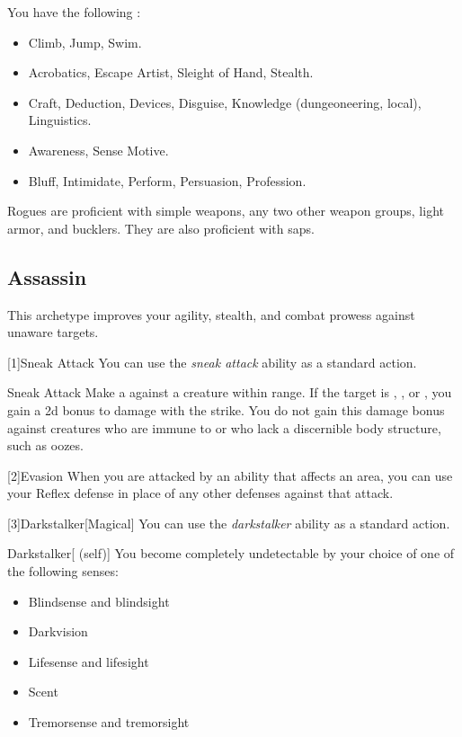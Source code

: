        You have the following :
        \begin{itemize}
            \item {} Climb, Jump, Swim.
            \item {} Acrobatics, Escape Artist, Sleight of Hand, Stealth.
            \item {} Craft, Deduction, Devices, Disguise, Knowledge (dungeoneering, local), Linguistics.
            \item {} Awareness, Sense Motive.
            \item {} Bluff, Intimidate, Perform, Persuasion, Profession.
        \end{itemize}

        Rogues are proficient with simple weapons, any two other weapon groups, light armor, and bucklers.
        They are also proficient with saps.

    \subsection{Assassin}
        This archetype improves your agility, stealth, and combat prowess against unaware targets.

        [1]{Sneak Attack} You can use the \textit{sneak attack} ability as a standard action.
        \begin{freeability}{Sneak Attack}
            Make a  against a creature within \rngclose range.
            If the target is \unaware, , or , you gain a \plus2d bonus to damage with the strike.
            You do not gain this damage bonus against creatures who are immune to  or who lack a discernible body structure, such as oozes.
        \end{freeability}

        [2]{Evasion} When you are attacked by an ability that affects an area, you can use your Reflex defense in place of any other defenses against that attack.

        [3]{Darkstalker}[Magical] You can use the \textit{darkstalker} ability as a standard action.
        \begin{attuneability}{Darkstalker}[ (self)]
            You become completely undetectable by your choice of one of the following senses:
            \begin{itemize}
                \item Blindsense and blindsight
                \item Darkvision
                \item Lifesense and lifesight
                \item Scent
                \item Tremorsense and tremorsight
            \end{itemize}
        \end{attuneability}

